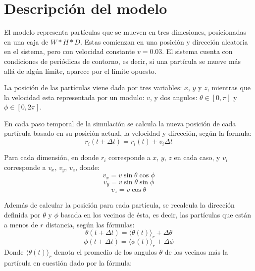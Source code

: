 \documentclass{article}
\begin{document}
\section{Descripci\'on del modelo}
\par
El modelo representa part\'iculas que se mueven en tres dimesiones, posicionadas en una caja de $W * H * D$. Estas comienzan en una posici\'on y direcci\'on aleatoria en el sistema, pero con velocidad constante $v = 0.03$. El sistema cuenta con condiciones de peri\'odicas de contorno, es decir, si una part\'icula se mueve m\'as all\'a de alg\'un l\'imite, aparece por el l\'imite opuesto.
\par La posici\'on de las part\'iculas viene dada por tres variables: $x$, $y$ y $z$, mientras que la velocidad esta representada por un modulo: $v$,  y dos angulos: $\theta \in [0, \pi]$ y $\phi \in [0, 2\pi]$.
\par
En cada paso temporal de la simulaci\'on se calcula la nueva posici\'on de cada part\'icula basado en su posici\'on actual, la velocidad y direcci\'on, seg\'un la formula:
\begin{equation}
r_i (t + \Delta t) = r_i (t) + v_i \Delta t
\end{equation}
\par 
Para cada dimensi\'on, en donde $r_i$ corresponde a $x$, $y$, $z$ en cada caso, y $v_i$ corresponde a $v_x$, $v_y$, $v_z$, donde:
\begin{equation}
v_x = v \sin \theta \cos \phi 
\end{equation}
\begin{equation}
v_y = v \sin \theta \sin \phi 
\end{equation}
\begin{equation}
v_z = v \cos \theta 
\end{equation}
\par
Adem\'as de calcular la posici\'on para cada part\'icula, se recalcula la direcci\'on definida por $\theta$ y $\phi$ basada en los vecinos de \'esta, es decir, las part\'iculas que est\'an a menos de $r$ distancia, seg\'un las f\'ormulas:
\begin{equation}
\theta (t + \Delta t) = \langle \theta (t) \rangle_r + \Delta \theta
\end{equation}
\begin{equation}
\phi (t + \Delta t) = \langle \phi (t) \rangle_r + \Delta \phi
\end{equation}
Donde $\langle \theta (t) \rangle_r$ denota el promedio de los angulos $\theta$ de los vecinos m\'as la part\'icula en cuesti\'on dado por la f\'ormula:
\end{document}
